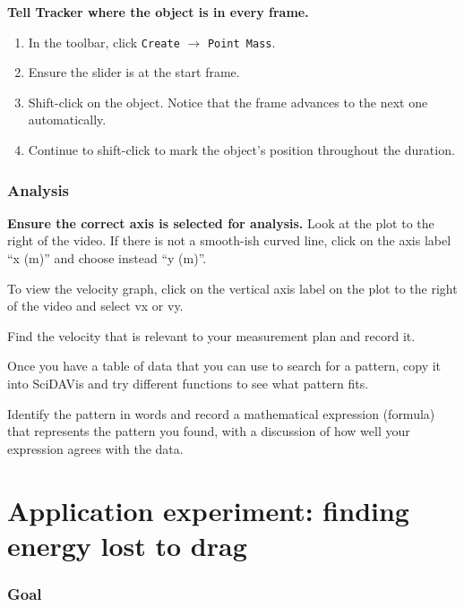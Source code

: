 \begin{steps}
	\item \textbf{Tell Tracker where the object is in every frame.}
	\begin{enumerate}
		\item In the toolbar, click \texttt{Create} $\rightarrow$ \texttt{Point Mass}.
		\item Ensure the slider is at the start frame.
		\item Shift-click on the object. Notice that the frame advances to the next one automatically.
		\item Continue to shift-click to mark the object's position throughout the duration.
	\end{enumerate}
\end{steps}

\subsubsection{Analysis}

\begin{steps}
	\item \textbf{Ensure the correct axis is selected for analysis.} Look at the plot to the right of the video. If there is not a smooth-ish curved line, click on the axis label ``x (m)'' and choose instead ``y (m)''.
	
	\item To view the velocity graph, click on the vertical axis label on the plot to the right of the video and select vx or vy.
	
	\item Find the velocity that is relevant to your measurement plan and record it.
	
	\item Once you have a table of data that you can use to search for a pattern, copy it into SciDAVis and try different functions to see what pattern fits.
	
	\item Identify the pattern in words and record a mathematical expression (formula) that represents the pattern you found, with a discussion of how well your expression agrees with the data.
\end{steps}

\section{Application experiment: finding energy lost to drag}

\subsubsection{Goal}

